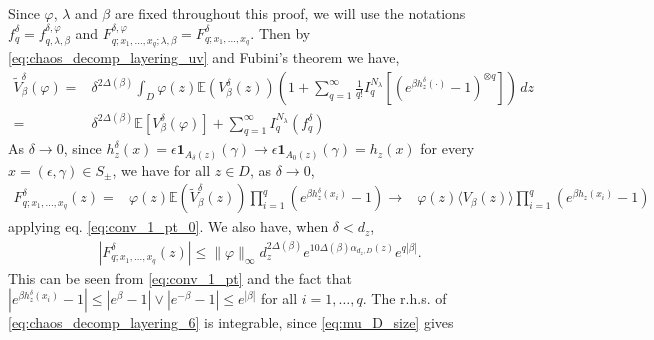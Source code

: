 \documentclass[a4paper, 11pt, reqno]{amsart}
\theoremstyle{definition} \newtheorem{defn}{Definition}[section]
\theoremstyle{remark} \newtheorem{rem}[defn]{Remark}
\theoremstyle{remark} \newtheorem*{rem*}{Remark}
\theoremstyle{plain} \newtheorem{thm}[defn]{Theorem}
\theoremstyle{plain} \newtheorem{lem}[defn]{Lemma}
\theoremstyle{plain} \newtheorem{prop}[defn]{Proposition}
\theoremstyle{plain} \newtheorem{cor}[defn]{Corollary}
\theoremstyle{remark} \newtheorem{exm}[defn]{\textbf{Example}}
\theoremstyle{remark} \newtheorem{exms}[defn]{\textbf{Examples}}
\theoremstyle{remark} \newtheorem*{bl}{}
\numberwithin{equation}{section} %
\newcommand{\E}{\mathbb{E}}
\newcommand{\ind}{\mathbf{1}}
\begin{document}
    Since $\varphi$, $\lambda$ and $\beta$ are fixed throughout this proof, we will use the notations $f^{\delta}_{q}= f^{\delta, \varphi}_{q, \lambda, \beta}$ and $F^{\delta, \varphi}_{q; x_1, \ldots, x_q; \lambda, \beta} = F^{\delta}_{q; x_1, \ldots, x_q}$. Then by \eqref{eq:chaos_decomp_layering_uv} and Fubini's theorem we have,
		\begin{align}\label{eq:chaos_decomp_layering_3}
			\tilde{V}^{\delta}_{\beta}(\varphi) 
	        = & \delta^{2\Delta(\beta)} \int_D \varphi(z) \E(V^{\delta}_{\beta}(z)) \left( 1 + \sum_{q=1}^{\infty} \frac{1}{q!} I_q^{N_{\lambda}} \left[(e^{\beta h^{\delta}_z(\cdot)}-1)^{\otimes q}\right]\right) \, dz
			\nonumber \\
			= & \delta^{2\Delta(\beta)} \E[V^{\delta}_{\beta}(\varphi)] + \sum_{q=1}^{\infty} I_q^{N_{\lambda}} (f^{\delta}_{ q})
		\end{align}	
		As $\delta \to 0$, since $h^{\delta}_z (x) = \epsilon \ind_{A_{\delta}(z)}(\gamma) \to \epsilon \ind_{A_0(z)} (\gamma) =  h_z(x)$ for every $x =(\epsilon, \gamma) \in S_{\pm}$, we have for all $z \in D$, as $\delta \to 0$,
		\begin{align}\label{eq:chaos_decomp_layering_5}
			F^{\delta}_{q; x_1, \ldots, x_q} (z ) = & \varphi(z) \E\left(\tilde{V}^{\delta}_{\beta}(z)\right) \prod_{i=1}^{q} \left(e^{\beta h^{\delta}_z(x_i)}-1\right)
			\to & \varphi(z) \langle V_{\beta}(z) \rangle \prod_{i=1}^q\left(e^{\beta h_z(x_i)} -1\right)
		\end{align}
        applying  eq. \eqref{eq:conv_1_pt_0}. We also have, when $\delta < d_z$, 
		\begin{align}\label{eq:chaos_decomp_layering_6}
			|F^{\delta}_{q; x_1, \ldots, x_q}(z)| 
			\le  \lVert \varphi \rVert_{\infty} d_z ^{2\Delta(\beta)} e^{10\Delta(\beta) \alpha_{d_z,D}(z)} e^{q|\beta|}.
		\end{align}
		This can be seen from \eqref{eq:conv_1_pt} and the fact that $|e^{\beta h^{\delta}_z(x_i)}-1| \le |e^{\beta} -1|\vee |e^{-\beta} -1| \le e^{|\beta|}$ for all $i =1, \ldots, q$. The r.h.s. of \eqref{eq:chaos_decomp_layering_6} is integrable, since \eqref{eq:mu_D_size} gives
\end{document}
